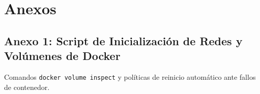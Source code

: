 \documentclass[12pt,a4paper]{article}
\begin{document}
\vspace{0.4cm}

\section{Anexos}
\subsection*{Anexo 1: Script de Inicialización de Redes y Volúmenes de Docker}
Comandos \texttt{docker volume inspect} y políticas de reinicio automático ante fallos de contenedor.
\end{document}
